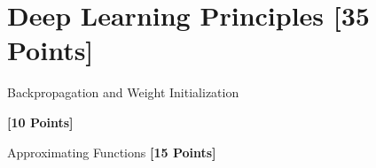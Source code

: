 \newif\ifshowsolutions
\showsolutionstrue







\pagestyle{fancy}




\newpage
\section{Deep Learning Principles [35 Points]}
 
\begin{problem}[10]
  Backpropagation and Weight Initialization
\end{problem}

\subproblem[5]

\begin{subsolution}

\end{subsolution}

\subproblem[5]

\begin{subsolution}

\end{subsolution}



\problem \textbf{[10 Points]}


\begin{solution}

\end{solution}



\problem Approximating Functions \textbf{[15 Points]}

\subproblem[7]

\begin{subsolution}

\end{subsolution}

\subproblem[8]

\begin{subsolution}

\end{subsolution}
 

